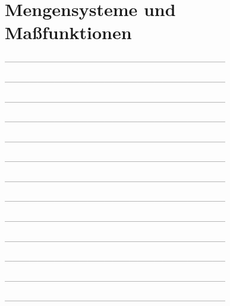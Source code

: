 \setcounter{exercise}{0}

\section{Mengensysteme und Maßfunktionen}

--------------------------------------------------------------------------------



--------------------------------------------------------------------------------



--------------------------------------------------------------------------------



--------------------------------------------------------------------------------



--------------------------------------------------------------------------------



--------------------------------------------------------------------------------



--------------------------------------------------------------------------------



--------------------------------------------------------------------------------



--------------------------------------------------------------------------------



--------------------------------------------------------------------------------



--------------------------------------------------------------------------------



--------------------------------------------------------------------------------



--------------------------------------------------------------------------------

